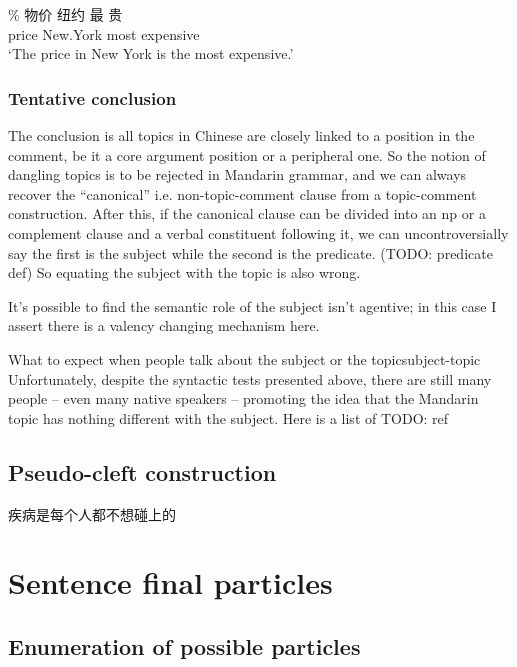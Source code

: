 \documentclass[UTF8, a4paper, oneside, scheme=plain, 12pt]{ctexrep}
\newcommand{\translate}[1]{`#1'}
\begin{document}
\begin{exe}
    \ex \gll \% 物价 纽约 最 贵  \\
    {} price New.York most expensive \\
    \glt \translate{The price in New York is the most expensive.}
\end{exe}

\subsection{Tentative conclusion}

The conclusion is all topics in Chinese are closely linked to a position in the comment,
be it a core argument position or a peripheral one.
So the notion of dangling topics is to be rejected in Mandarin grammar,
and we can always recover the ``canonical'' i.e. non-topic-comment clause
from a topic-comment construction.
After this, if the canonical clause can be divided into an \acs{np}
or a complement clause and a verbal constituent following it,
we can uncontroversially say the first is the subject while the second is the predicate. (TODO: predicate def)
So equating the subject with the topic is also wrong.

It's possible to find the semantic role of the subject isn't agentive;
in this case I assert there is a valency changing mechanism here.

\begin{infobox}{What to expect when people talk about the subject or the topic}{subject-topic}
    Unfortunately, despite the syntactic tests presented above,
    there are still many people -- even many native speakers -- 
    promoting the idea that the Mandarin topic has nothing different with the subject.
    Here is a list of TODO: ref
\end{infobox}

\section{Pseudo-cleft construction}

\begin{exe}
    \ex 疾病是每个人都不想碰上的
\end{exe}

\chapter{Sentence final particles}

\section{Enumeration of possible particles}\label{sec:sfp.all}
\end{document}

